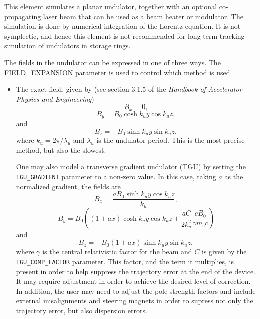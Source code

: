This element simulates a planar undulator, together with an optional
co-propagating laser beam that can be used as a beam heater or
modulator.  The simulation is done by numerical integration of the
Lorentz equation.  It is not symplectic, and hence this element is not
recommended for long-term tracking simulation of undulators in storage
rings.  

The fields in the undulator can be expressed in one of three ways.
The FIELD\_EXPANSION parameter is used to control which method is used.
\begin{itemize}
\item The exact field, given by (see section 3.1.5 of the {\em Handbook of
Accelerator Physics and Engineering})
\begin{equation}
B_x = 0,
\end{equation}
\begin{equation}
B_y = B_0 \cosh k_u y \cos k_u z,
\end{equation}
and
\begin{equation}
B_z = -B_0 \sinh k_u y \sin k_u z ,
\end{equation}
where $k_u = 2\pi/\lambda_u$ and $\lambda_u$ is the undulator period.
This is the most precise method, but also the slowest.  

One may also model a transverse gradient undulator (TGU) by setting the \verb|TGU_GRADIENT| parameter
to a non-zero value.
In this case, taking $a$ as the normalized gradient, the fields are \cite{RLindbergPC}
\begin{equation}
B_x = \frac{a B_0 \sinh k_u y \cos k_u z}{k_u},
\end{equation}
\begin{equation}
B_y = B_0 \left((1 + a x) \cosh k_u y \cos k_u z + \frac{a C }{2 k_u^2}\frac{e B_0}{\gamma m_e c }\right)
\end{equation}
and
\begin{equation}
B_z = -B_0 (1 + a x) \sinh k_u y \sin k_u z,
\end{equation}
where $\gamma$ is the central relativistic factor for the beam and $C$ is given by the
\verb|TGU_COMP_FACTOR| parameter.
This factor, and the term it multiplies, is present in order to help suppress the 
trajectory error at the end of the device.
It may require adjustment in order to achieve the desired level of correction.
In addition, the user may need to adjust the pole-strength factors and include external misalignments
and steering magnets in order to supress not only the trajectory error, but also dispersion errors.


\end{itemize}
